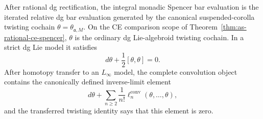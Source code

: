 \begin{theorem}
\label{thm:as-rational-mc-formula}
After rational dg rectification, the integral monadic Spencer bar evaluation
is the iterated relative dg bar evaluation generated by the canonical
suspended-corolla twisting cochain
$\theta=\theta_{\mathfrak a,M}$.  On the CE comparison scope of
Theorem~\ref{thm:as-rational-ce-spencer}, $\theta$ is the ordinary dg
Lie-algebroid twisting cochain.  In a strict dg Lie model it satisfies
\[
\boxed{
    d\theta+\frac12[\theta,\theta]=0.
}
\]
After homotopy transfer to an $L_\infty$ model, the complete convolution
object contains the canonically defined inverse-limit element
\[
\boxed{
    d\theta+
    \sum_{n\ge2}
    \frac1{n!}
    \ell_n^{\mathrm{conv}}(\theta,\ldots,\theta),
}
\]
and the transferred twisting identity says that this element is zero.
\end{theorem}

